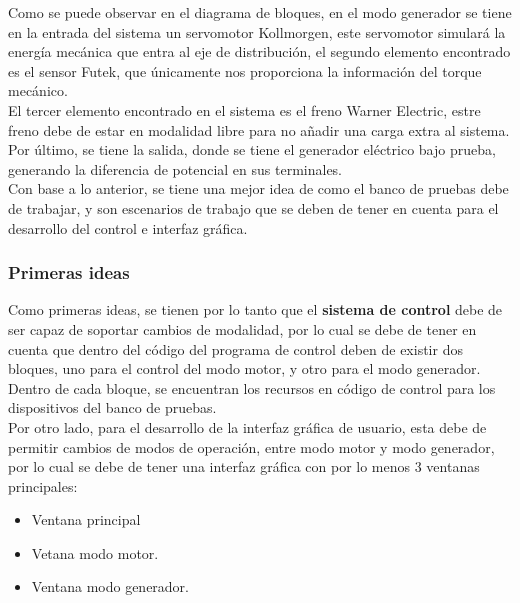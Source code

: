 \documentclass[12pt,titlepage]{article}
\begin{document}
Como se puede observar en el diagrama de bloques, en el modo generador se tiene en la entrada del sistema un servomotor Kollmorgen, este servomotor simulará la energía mecánica que entra al eje de distribución, el segundo elemento encontrado es el sensor Futek, que únicamente nos proporciona la información del torque mecánico. \\ 

El tercer elemento encontrado en el sistema es el freno Warner Electric, estre freno debe de estar en modalidad libre para no añadir una carga extra al sistema. \\ 

Por último, se tiene la salida, donde se tiene el generador eléctrico bajo prueba, generando la diferencia de potencial en sus terminales. \\

Con base a lo anterior, se tiene una mejor idea de como el banco de pruebas debe de trabajar, y son escenarios de trabajo que se deben de tener en cuenta para el desarrollo del control e interfaz gráfica. \\ 

\subsubsection{Primeras ideas}
Como primeras ideas, se tienen por lo tanto que el \textbf{sistema de control} debe de ser capaz de soportar cambios de modalidad, por lo cual se debe de tener en cuenta que dentro del código del programa de control deben de existir dos bloques, uno para el control del modo motor, y otro para el modo generador. \\ 

Dentro de cada bloque, se encuentran los recursos en código de control para los dispositivos del banco de pruebas. \\
\newpage
Por otro lado, para el desarrollo de la interfaz gráfica de usuario, esta debe de permitir cambios de modos de operación, entre modo motor y modo generador, por lo cual se debe de tener una interfaz gráfica con por lo menos 3 ventanas principales: \\

\begin{itemize}
\item Ventana principal
\item Vetana modo motor. 
\item Ventana modo generador.
\end{itemize}
\end{document}
